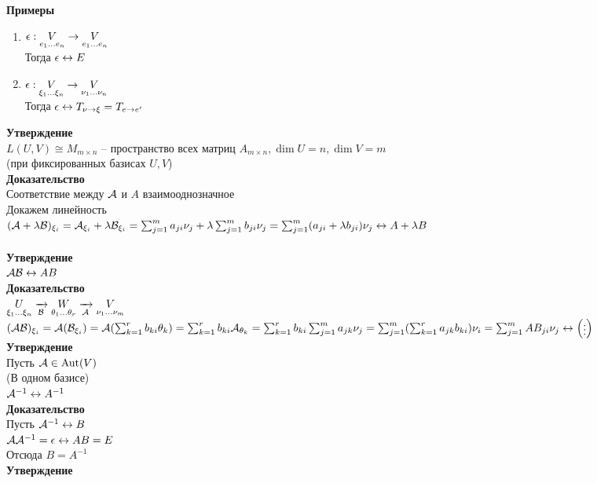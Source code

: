\documentclass[12pt]{article}
\begin{document}
\textbf{Примеры}
\begin{enumerate}
    \item $\epsilon: \underset{e_1\ldots e_n}V \rightarrow \underset{e_1 \ldots e_n}V$\\
    Тогда $\epsilon \leftrightarrow E$
    \item $\epsilon: \underset{\xi_1\ldots \xi_n}V \rightarrow \underset{\nu_1 \ldots \nu_n}V$\\
    Тогда $\epsilon \leftrightarrow T_{\nu \rightarrow \xi} = T_{e\rightarrow e'}$
\end{enumerate}
\textbf{Утверждение}\\
$L(U, V) \cong M_{m\times n}$ -- пространство всех матриц $A_{m\times n}, \dim U = n, \dim V = m$\\
(при фиксированных базисах $U, V$)\\
\textbf{Доказательство}\\
Соответствие между $\mathcal{A}$ и $A$ взаимооднозначное\\
Докажем линейность\\
$(\mathcal{A}+\lambda \mathcal{B})_{\xi_i} = \mathcal{A}_{\xi_i}+\lambda\mathcal{B}_{\xi_i} = \sum_{j=1}^m a_{ji}\nu_j + \lambda \sum_{j=1}^m b_{ji}\nu_j = \sum_{j=1}^m(a_{ji} + \lambda b_{ji})\nu_j \leftrightarrow A+\lambda B$\\\\
\textbf{Утверждение}\\
$\mathcal{A}\mathcal{B} \leftrightarrow AB$\\
\textbf{Доказательство}\\
$\underset{\xi_1\ldots\xi_n}{U}\xrightarrow[\mathcal{B}]{} \underset{\theta_1\ldots\theta_r}{W} \xrightarrow[\mathcal{A}]{} \underset{\nu_1\ldots\nu_m}{V}$
$(\mathcal{A}\mathcal{B})_{\xi_i} = \mathcal{A}(\mathcal{B}_{\xi_i}) = \mathcal{A}(\sum_{k=1}^r b_{ki}\theta_k) = \sum_{k=1}^r b_{ki}\mathcal{A}_{\theta_k} = \sum_{k=1}^rb_{ki}\sum_{j=1}^m a_{jk}\nu_j = \sum_{j=1}^m(\sum_{k=1}^r a_{jk}b_{ki})\nu_i = \sum_{j=1}^m AB_{ji} \nu_j \leftrightarrow \begin{pmatrix}
    \vdots
\end{pmatrix}$\\
\textbf{Утверждение}\\
Пусть $\mathcal{A} \in \operatorname{Aut}(V)$\\
(В одном базисе)\\
$\mathcal{A}^{-1} \leftrightarrow A^{-1}$\\
\textbf{Доказательство}\\
Пусть $\mathcal{A}^{-1} \leftrightarrow B$\\
$\mathcal{A}\mathcal{A}^{-1} = \epsilon \leftrightarrow AB = E$\\
Отсюда $B = A^{-1}$\\
\textbf{Утверждение}\\
\end{document}
